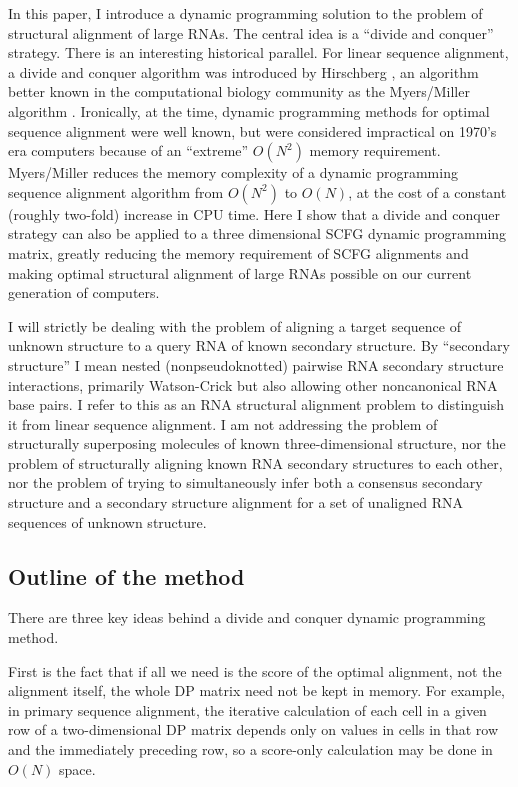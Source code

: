 In this paper, I introduce a dynamic programming solution to the
problem of structural alignment of large RNAs. The central idea is a
``divide and conquer'' strategy. There is an interesting historical
parallel.  For linear sequence alignment, a divide and conquer
algorithm was introduced by Hirschberg \cite{Hirschberg75}, an
algorithm better known in the computational biology community as the
Myers/Miller algorithm \cite{MyM-88a}.  Ironically, at the time,
dynamic programming methods for optimal sequence alignment were well
known, but were considered impractical on 1970's era computers because
of an ``extreme'' $O(N^2)$ memory requirement. Myers/Miller reduces
the memory complexity of a dynamic programming sequence alignment
algorithm from $O(N^2)$ to $O(N)$, at the cost of a constant (roughly
two-fold) increase in CPU time. Here I show that a divide and conquer
strategy can also be applied to a three dimensional SCFG dynamic
programming matrix, greatly reducing the memory requirement of SCFG
alignments and making optimal structural alignment of large RNAs
possible on our current generation of computers.

I will strictly be dealing with the problem of aligning a target
sequence of unknown structure to a query RNA of known secondary
structure. By ``secondary structure'' I mean nested (nonpseudoknotted)
pairwise RNA secondary structure interactions, primarily Watson-Crick
but also allowing other noncanonical RNA base pairs. I refer to this
as an RNA structural alignment problem to distinguish it from linear
sequence alignment. I am not addressing the problem of structurally
superposing molecules of known three-dimensional structure, nor the
problem of structurally aligning known RNA secondary structures to
each other, nor the problem of trying to simultaneously infer both a
consensus secondary structure and a secondary structure alignment for
a set of unaligned RNA sequences of unknown structure.

\subsection{Outline of the method}

There are three key ideas behind a divide and conquer dynamic
programming method.

First is the fact that if all we need is the score of the optimal
alignment, not the alignment itself, the whole DP matrix need not be
kept in memory. For example, in primary sequence alignment, the
iterative calculation of each cell in a given row of a two-dimensional
DP matrix depends only on values in cells in that row and the
immediately preceding row, so a score-only calculation may be done in
$O(N)$ space.

